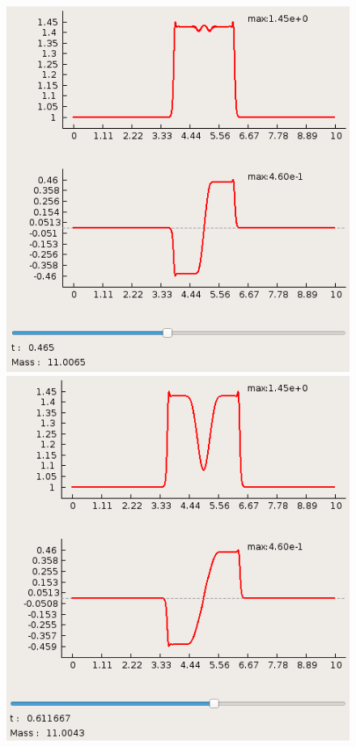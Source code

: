 \documentclass[a4paper, 11pt]{article}
\begin{document}
\begin{figure}[H]
\begin{minipage}[H] {0.49\linewidth}
	\end{minipage}
	\begin{minipage}[H] {0.49\linewidth}
		\includegraphics[width=1\linewidth]{p1/p1_t=0,465_supr.png}
	\end{minipage}
		\begin{minipage}[H] {0.49\linewidth}
		\includegraphics[width=1\linewidth]{p1/p1_t=0,611_supr.png}
	\end{minipage}
	\end{figure}
\end{document}
